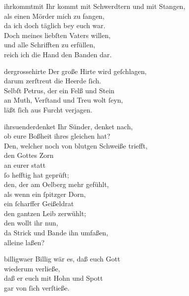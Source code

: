 \documentclass[tocstyle=ref-genre]{ees}
\begin{document}
{\begin{movement}{ihrkommtmit}
  Ihr kommt mit Schwerdtern und mit Stangen,\\
  als einen Mörder mich zu fangen,\\
  da ich doch täglich bey euch war.\\
  Doch meines liebſten Vaters willen,\\
  und alle Schrifften zu erfüllen,\\
  reich ich die Hand den Banden dar.
\end{movement}

\clearpage
\begin{movement}{dergrossehirte}
  Der große Hirte wird geſchlagen,\\
  darum zerſtreut die Heerde ſich.\\
  Selbſt Petrus, der ein Felß und Stein\\
  an Muth, Verſtand und Treu wolt ſeyn,\\
  läßt ſich aus Furcht verjagen.
\end{movement}

\begin{movement}{ihrsuenderdenket}
  Ihr Sünder, denket nach,\\
  ob eure Boßheit ihres gleichen hat?\\
  Den, welcher noch von blutgen Schweiße triefft,\\
  den Gottes Zorn\\
  an eurer statt\\
  ſo hefftig hat geprüft;\\
  den, der am Oelberg mehr gefühlt,\\
  als wenn ein ſpitzger Dorn,\\
  ein ſcharffer Geißeldrat\\
  den gantzen Leib zerwühlt;\\
  den wollt ihr nun,\\
  da Strick und Bande ihn umfaßen,\\
  alleine laßen?
\end{movement}

\begin{movement}{billigwaer}
  Billig wär es, daß euch Gott\\
  wiederum verließe,\\
  daß er euch mit Hohn und Spott\\
  gar von ſich verſtieße.
\end{movement}

}
\end{document}
